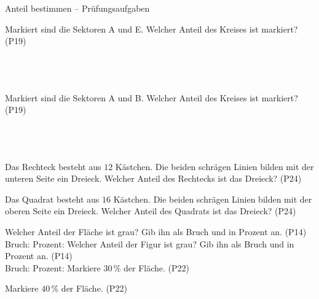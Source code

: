 \begin{aufgabe}{Anteil bestimmen – Prüfungsaufgaben}
\begin{teile}
\teil Markiert sind die Sektoren A und E. Welcher Anteil des Kreises ist markiert? \hfill (P19)\\ \\ \\ \\ 

\teil Markiert sind die Sektoren A und B. Welcher Anteil des Kreises ist markiert? \hfill (P19)\\ \\ \\ \\ 

\teil Das Rechteck besteht aus $12$ Kästchen. Die beiden schrägen Linien bilden mit der unteren Seite ein Dreieck. Welcher Anteil des Rechtecks ist das Dreieck? \hfill (P24) \\

\begin{ksys}[xmin=0,xmax=6,ymin=0,ymax=2,ablesen]   \end{ksys}
\leerfeld
\teil Das Quadrat besteht aus $16$ Kästchen. Die beiden schrägen Linien bilden mit der oberen Seite ein Dreieck. Welcher Anteil des Quadrats ist das Dreieck? \hfill (P24) \\

\begin{ksys}[xmin=0,xmax=4,ymin=0,ymax=4,ablesen]   \end{ksys}
\leerfeld
\teil Welcher Anteil der Fläche ist grau? Gib ihn als Bruch und in Prozent an. \hfill (P14) \\

Bruch: \leerfeld Prozent: \leerfeld[\%]
\teil Welcher Anteil der Figur ist grau? Gib ihn als Bruch und in Prozent an. \hfill (P14) \\

Bruch: \leerfeld Prozent: \leerfeld[\%]
\teil Markiere $30\,\%$ der Fläche. \hfill (P22)

\teil Markiere $40\,\%$ der Fläche. \hfill (P22)


\end{teile}
\end{aufgabe}
